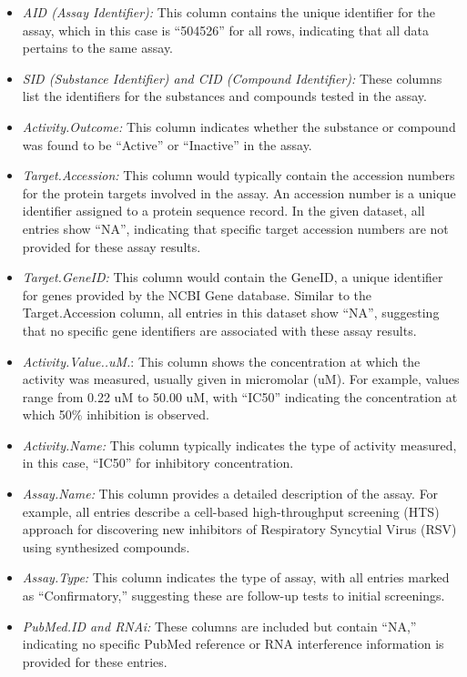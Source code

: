 \begin{itemize}
\item
  \emph{AID (Assay Identifier):} This column contains the unique identifier for the assay, which in this case is ``504526'' for all rows, indicating that all data pertains to the same assay.
\item
  \emph{SID (Substance Identifier) and CID (Compound Identifier):} These columns list the identifiers for the substances and compounds tested in the assay.
\item
  \emph{Activity.Outcome:} This column indicates whether the substance or compound was found to be ``Active'' or ``Inactive'' in the assay.
\item
  \emph{Target.Accession:} This column would typically contain the accession numbers for the protein targets involved in the assay. An accession number is a unique identifier assigned to a protein sequence record. In the given dataset, all entries show ``NA'', indicating that specific target accession numbers are not provided for these assay results.
\item
  \emph{Target.GeneID:} This column would contain the GeneID, a unique identifier for genes provided by the NCBI Gene database. Similar to the Target.Accession column, all entries in this dataset show ``NA'', suggesting that no specific gene identifiers are associated with these assay results.
\item
  \emph{Activity.Value..uM.}: This column shows the concentration at which the activity was measured, usually given in micromolar (uM). For example, values range from 0.22 uM to 50.00 uM, with ``IC50'' indicating the concentration at which 50\% inhibition is observed.
\item
  \emph{Activity.Name:} This column typically indicates the type of activity measured, in this case, ``IC50'' for inhibitory concentration.
\item
  \emph{Assay.Name:} This column provides a detailed description of the assay. For example, all entries describe a cell-based high-throughput screening (HTS) approach for discovering new inhibitors of Respiratory Syncytial Virus (RSV) using synthesized compounds.
\item
  \emph{Assay.Type:} This column indicates the type of assay, with all entries marked as ``Confirmatory,'' suggesting these are follow-up tests to initial screenings.
\item
  \emph{PubMed.ID and RNAi:} These columns are included but contain ``NA,'' indicating no specific PubMed reference or RNA interference information is provided for these entries.
\end{itemize}

